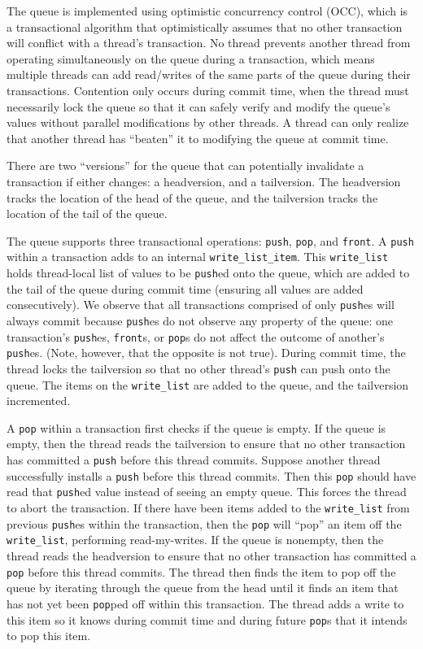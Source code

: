 The queue is implemented using optimistic concurrency control (OCC), which is a transactional algorithm that optimistically assumes that no other transaction will conflict with a thread’s transaction. No thread prevents another thread from operating simultaneously on the queue during a transaction, which means multiple threads can add read/writes of the same parts of the queue during their transactions. Contention only occurs during commit time, when the thread must necessarily lock the queue so that it can safely verify and modify the queue’s values without parallel modifications by other threads. A thread can only realize that another thread has “beaten” it to modifying the queue at commit time.

There are two “versions” for the queue that can potentially invalidate a transaction if either changes: a headversion, and a tailversion. The headversion tracks the location of the head of the queue, and the tailversion tracks the location of the tail of the queue.

The queue supports three transactional operations: \texttt{push}, \texttt{pop}, and \texttt{front}. A \texttt{push} within a transaction adds to an internal \texttt{write\_list\_item}. This \texttt{write\_list} holds thread-local list of values to be \texttt{push}ed onto the queue, which are added to the tail of the queue during commit time (ensuring all values are added consecutively). We observe that all transactions comprised of only \texttt{push}es will always commit because \texttt{push}es do not observe any property of the queue: one transaction’s \texttt{push}es, \texttt{front}s, or \texttt{pop}s do not affect the outcome of another’s \texttt{push}es. (Note, however, that the opposite is not true). During commit time, the thread locks the tailversion so that no other thread’s \texttt{push} can push onto the queue. The items on the \texttt{write\_list} are added to the queue, and the tailversion incremented.

A \texttt{pop} within a transaction first checks if the queue is empty. If the queue is empty, then the thread reads the tailversion to ensure that no other transaction has committed a \texttt{push} before this thread commits. Suppose another thread successfully installs a \texttt{push} before this thread commits. Then this \texttt{pop} should have read that \texttt{push}ed value instead of seeing an empty queue. This forces the thread to abort the transaction. If there have been items added to the \texttt{write\_list} from previous \texttt{push}es within the transaction, then the \texttt{pop} will “pop” an item off the \texttt{write\_list}, performing read-my-writes. If the queue is nonempty, then the thread reads the headversion to ensure that no other transaction has committed a \texttt{pop} before this thread commits. The thread then finds the item to pop off the queue by iterating through the queue from the head until it finds an item that has not yet been \texttt{pop}ped off within this transaction. The thread adds a write to this item so it knows during commit time and during future \texttt{pop}s that it intends to pop this item.

